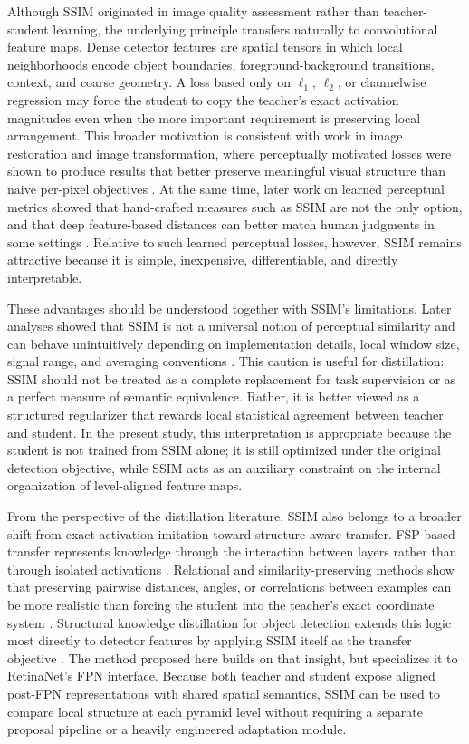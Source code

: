 Although SSIM originated in image quality assessment rather than teacher-student learning, the underlying principle transfers naturally to convolutional feature maps. Dense detector features are spatial tensors in which local neighborhoods encode object boundaries, foreground-background transitions, context, and coarse geometry. A loss based only on $\ell_1$, $\ell_2$, or channelwise regression may force the student to copy the teacher's exact activation magnitudes even when the more important requirement is preserving local arrangement. This broader motivation is consistent with work in image restoration and image transformation, where perceptually motivated losses were shown to produce results that better preserve meaningful visual structure than naive per-pixel objectives \cite{zhao2015imgloss,johnson2016perceptual}. At the same time, later work on learned perceptual metrics showed that hand-crafted measures such as SSIM are not the only option, and that deep feature-based distances can better match human judgments in some settings \cite{zhang2018lpips}. Relative to such learned perceptual losses, however, SSIM remains attractive because it is simple, inexpensive, differentiable, and directly interpretable.

These advantages should be understood together with SSIM's limitations. Later analyses showed that SSIM is not a universal notion of perceptual similarity and can behave unintuitively depending on implementation details, local window size, signal range, and averaging conventions \cite{nilsson2020understandssim,venkataramanan2021ssimguide}. This caution is useful for distillation: SSIM should not be treated as a complete replacement for task supervision or as a perfect measure of semantic equivalence. Rather, it is better viewed as a structured regularizer that rewards local statistical agreement between teacher and student. In the present study, this interpretation is appropriate because the student is not trained from SSIM alone; it is still optimized under the original detection objective, while SSIM acts as an auxiliary constraint on the internal organization of level-aligned feature maps.

From the perspective of the distillation literature, SSIM also belongs to a broader shift from exact activation imitation toward structure-aware transfer. FSP-based transfer represents knowledge through the interaction between layers rather than through isolated activations \cite{yim2017fsp}. Relational and similarity-preserving methods show that preserving pairwise distances, angles, or correlations between examples can be more realistic than forcing the student into the teacher's exact coordinate system \cite{park2019rkd,tung2019spkd,peng2019cckd}. Structural knowledge distillation for object detection extends this logic most directly to detector features by applying SSIM itself as the transfer objective \cite{derijk2022structural}. The method proposed here builds on that insight, but specializes it to RetinaNet's FPN interface. Because both teacher and student expose aligned post-FPN representations with shared spatial semantics, SSIM can be used to compare local structure at each pyramid level without requiring a separate proposal pipeline or a heavily engineered adaptation module.

